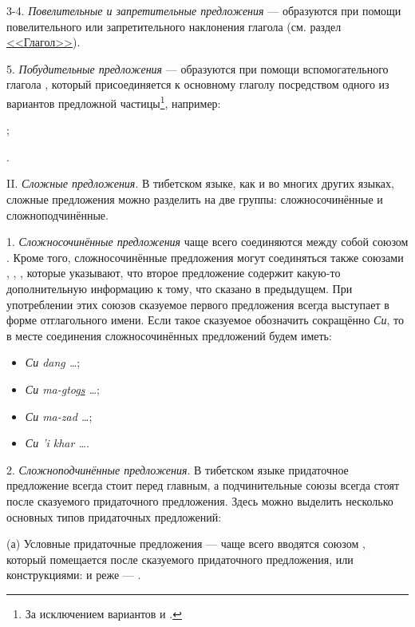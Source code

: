 3-4. \emph{Повелительные и запретительные предложения} --- образуются при помощи повелительного или запретительного наклонения глагола (см. раздел \hyperref[sec:glagol]{<<Глагол>>}).

5. \emph{Побудительные предложения} --- образуются при помощи вспомогательного глагола , который присоединяется к основному глаголу посредством одного из вариантов предложной частицы\footnote[53]{За исключением вариантов  и .}, например:
\begin{prfsample}
	\item {};
	\item {}.
\end{prfsample}

II. \label{sec:sintaks:slozhn}\emph{Сложные предложения}. В тибетском языке, как и во многих других языках, сложные предложения можно разделить на две группы: сложносочинённые и сложноподчинённые.

1. \emph{Сложносочинённые предложения} чаще всего соединяются между собой союзом . Кроме того, сложносочинённые предложения могут соединяться также союзами , , , которые указывают, что второе предложение содержит какую-то дополнительную информацию к тому, что сказано в предыдущем. При употреблении этих союзов сказуемое первого предложения всегда выступает в форме отглагольного имени. Если такое сказуемое обозначить сокращённо \emph{Си}, то в месте соединения сложносочинённых предложений будем иметь:
\begin{itemize}
	\item \emph{Си dang \ldots{}};
	\item \emph{Си ma-\ul{g}tog\ul{s} \ldots{}};
	\item \emph{Си ma-zad \ldots{}};
	\item \emph{Си 'i khar \ldots{}}.
\end{itemize}

2. \emph{Сложноподчинённые предложения}. В тибетском языке придаточное предложение всегда стоит перед главным, а подчинительные союзы всегда стоят после сказуемого придаточного предложения. Здесь можно выделить несколько основных типов придаточных предложений:

(а)	Условные придаточные предложения --- чаще всего вводятся союзом , который помещается после сказуемого придаточного предложения, или конструкциями:
 и реже --- .

